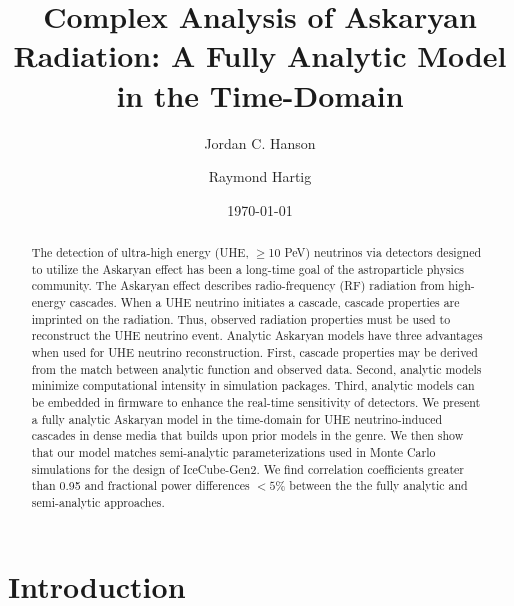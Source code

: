 \documentclass[amsmath,amssymb,aps,prd,10pt,twocolumn]{revtex4}
\begin{document}
\title{Complex Analysis of Askaryan Radiation: A Fully Analytic Model in the Time-Domain}

\author{Jordan C. Hanson}
\author{Raymond Hartig}
\date{\today}

\begin{abstract}
The detection of ultra-high energy (UHE, $\geq$10 PeV) neutrinos via detectors designed to utilize the Askaryan effect has been a long-time goal of the astroparticle physics community.  The Askaryan effect describes radio-frequency (RF) radiation from high-energy cascades.  When a UHE neutrino initiates a cascade, cascade properties are imprinted on the radiation.  Thus, observed radiation properties must be used to reconstruct the UHE neutrino event.  Analytic Askaryan models have three advantages when used for UHE neutrino reconstruction.  First, cascade properties may be derived from the match between analytic function and observed data.  Second, analytic models minimize computational intensity in simulation packages.  Third, analytic models can be embedded in firmware to enhance the real-time sensitivity of detectors.  We present a fully analytic Askaryan model in the time-domain for UHE neutrino-induced cascades in dense media that builds upon prior models in the genre.  We then show that our model matches semi-analytic parameterizations used in Monte Carlo simulations for the design of IceCube-Gen2.  We find correlation coefficients greater than 0.95 and fractional power differences $<5$\% between the the fully analytic and semi-analytic approaches.
\end{abstract}


\maketitle

\section{Introduction}
\end{document}
